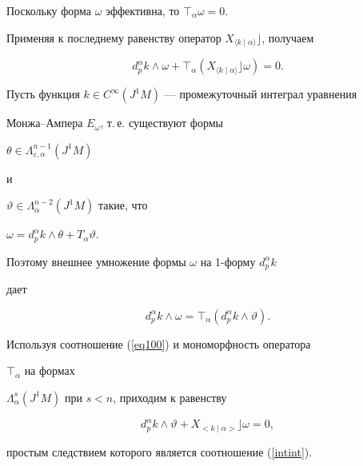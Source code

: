 \begin{pf}


Поскольку форма $\omega$ эффективна, то $\top_\alpha \omega =0$.


Применяя к последнему равенству оператор $X_{\langle k\mid


\alpha\rangle}\rfloor$, получаем


\begin{equation}


d_p^\alpha k\wedge \omega +\top_\alpha (X_{\langle k\mid \alpha\rangle}


\rfloor \omega)=0. \label{eq100}


\end{equation}


Пусть функция $k\in C^\infty (J^1M)$ --- промежуточный интеграл уравнения 


Монжа--Ампера $E_\omega $, т.\,е. существуют формы


$\theta\in \Lambda_{\varepsilon ,\alpha }^{n-1}(J^1M)$


и


$\vartheta \in \Lambda_\alpha^{n-2}(J^1M)$ такие, что 


$\omega =d_p^\alpha k\wedge \theta +T_\alpha \vartheta.$


Поэтому внешнее умножение формы $\omega $ на 1-форму $d_p^\alpha k$ 


дает


\begin{equation}


d_p^\alpha k\wedge \omega =\top_\alpha (d_p^\alpha k\wedge \vartheta ).


\end{equation}





Используя соотношение (\ref{eq100}) и мономорфность оператора 


$\top_\alpha $ на формах 


$\Lambda_\alpha^s(J^1M)$ при $s<n $, приходим к равенству


\begin{equation}


d_p^\alpha k\wedge \vartheta +X_{<k\mid \alpha >}\rfloor \omega =0,


\label{eq104}


\end{equation}


простым следствием которого является соотношение (\ref{intint}).






\end{pf}

